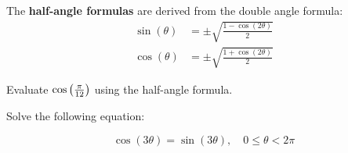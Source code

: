 \documentclass[mathNotesPreamble]{subfiles}
\begin{document}
    \begin{defn*}
      The \textbf{half-angle formulas} are derived from the double angle formula:
      \begin{align*}
        \sin(\theta)&=\pm\sqrt{\frac{1-\cos(2\theta)}{2}}\\
        \cos(\theta)&=\pm\sqrt{\frac{1+\cos(2\theta)}{2}}
      \end{align*}
    \end{defn*}
    \begin{ex*}
      Evaluate $\cos{\left(\frac{\pi}{12}\right)}$ using the half-angle formula.
    \end{ex*}
    
    \begin{ex*}
      Solve the following equation:
    \end{ex*}
      \[\cos(3\theta)=\sin(3\theta),\quad 0\leq\theta< 2\pi\]
    \pagebreak
\end{document}
